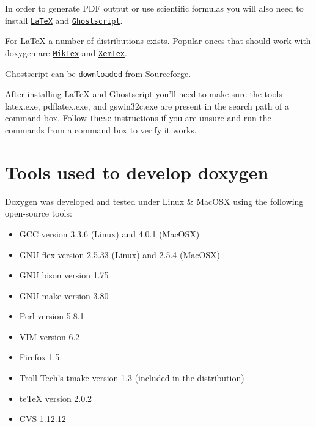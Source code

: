 In order to generate PDF output or use scientific formulas you will also need to install \href{http://en.wikipedia.org/wiki/LaTeX}{\tt LaTeX} and \href{http://en.wikipedia.org/wiki/Ghostscript}{\tt Ghostscript}.

For LaTeX a number of distributions exists. Popular onces that should work with doxygen are \href{http://www.miktex.org}{\tt MikTex} and \href{http://www.xemtex.org}{\tt XemTex}.

Ghostscript can be \href{http://sourceforge.net/projects/ghostscript/}{\tt downloaded} from Sourceforge.

After installing LaTeX and Ghostscript you'll need to make sure the tools latex.exe, pdflatex.exe, and gswin32c.exe are present in the search path of a command box. Follow \href{http://www.computerhope.com/issues/ch000549.htm}{\tt these} instructions if you are unsure and run the commands from a command box to verify it works.\hypertarget{install_build_tools}{}\section{Tools used to develop doxygen}\label{install_build_tools}
Doxygen was developed and tested under Linux \& MacOSX using the following open-source tools: \begin{itemize}
\item GCC version 3.3.6 (Linux) and 4.0.1 (MacOSX) \item GNU flex version 2.5.33 (Linux) and 2.5.4 (MacOSX) \item GNU bison version 1.75 \item GNU make version 3.80 \item Perl version 5.8.1 \item VIM version 6.2 \item Firefox 1.5 \item Troll Tech's tmake version 1.3 (included in the distribution) \item teTeX version 2.0.2 \item CVS 1.12.12 \end{itemize}


 